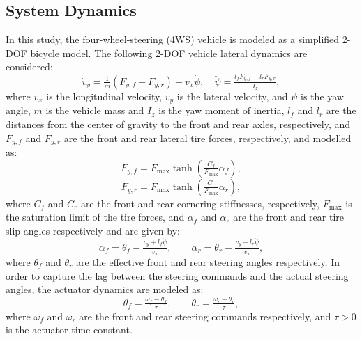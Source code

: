 \documentclass[conference]{IEEEtran}
\begin{document}
\subsection{System Dynamics}
In this study, the four-wheel-steering (4WS) vehicle is modeled as a simplified 2-DOF bicycle model.
The following 2-DOF vehicle lateral dynamics are considered:
\begin{equation} \label{eq:sys:lat:dyn}
    \dot{v}_y 
    =
    \tfrac{1}{m} 
    \left(
    F_{y,f} + F_{y,r}
    \right)
    - 
    v_x 
    \dot{\psi}
    , \quad
    \ddot{\psi} 
    = 
    \tfrac{l_fF_{y,f}
    -
    l_rF_{y,r}}{I_z}
    ,
\end{equation}
where $v_x$ is the longitudinal velocity, $v_y$ is the lateral velocity, and $\psi$ is the yaw angle, $m$ is the vehicle mass and $I_z$ is the yaw moment of inertia, $l_f$ and $l_r$ are the distances from the center of gravity to the front and rear axles, respectively, and $F_{y,f}$ and $F_{y,r}$ are the front and rear lateral tire forces, respectively, and modelled as:
\begin{equation} \label{eq:sys:lat:dyn:tire}
    F_{y,f} 
    = 
    F_{\max}
    \tanh
    \left(
        \tfrac{C_f}{F_{\max}}\alpha_f
    \right)
    , 
\end{equation}
\begin{equation}
    F_{y,r} 
    =
    F_{\max}
    \tanh
    \left(
        \tfrac{C_r}{F_{\max}} \alpha_r
    \right),
\end{equation}
where $C_f$ and $C_r$ are the front and rear cornering stiffnesses, respectively,
$F_{\max}$ is the saturation limit of the tire forces, and $\alpha_f$ and $\alpha_r$ are the front and rear tire slip angles respectively and 
are given by:
\begin{equation}
  \alpha_f
  = 
  \theta_f 
  - 
  \tfrac{v_y+l_f \dot{\psi}}{v_x}, 
  \qquad
  \alpha_r 
  = 
  \theta_r - 
  \tfrac{v_y-l_r \dot{\psi}}{v_x}
  ,
\end{equation}
where $\theta_f$ and $\theta_r$ are the effective front and rear steering angles respectively. 
In order to capture the lag between the steering commands and the actual steering angles, the actuator dynamics are modeled as:
\begin{equation} \label{eq:sys:actuator:lag}
  \dot{\theta}_f 
  = \tfrac{\omega_f-\theta_f}{\tau}, 
  \qquad
  \dot{\theta}_r 
  = 
  \tfrac{\omega_r-\theta_r}{\tau}
  ,
\end{equation}
where $\omega_f$ and $\omega_r$ are the front and rear steering commands respectively, and $\tau>0$ is the actuator time constant.
\end{document}
